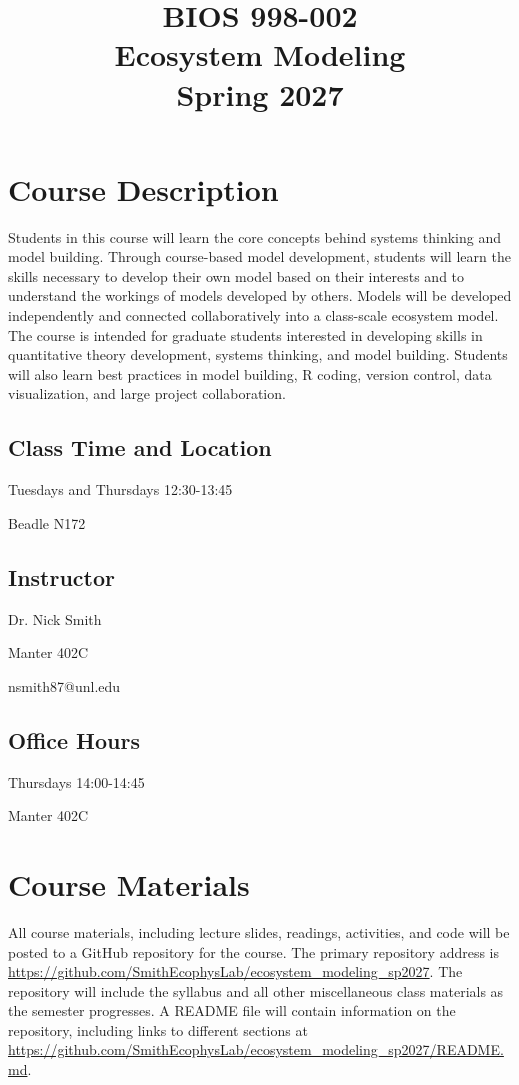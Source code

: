 \documentclass[12pt, notitlepage]{article}   	%
\title{
	\textbf{
		BIOS 998-002
	} \\
	\large Ecosystem Modeling \\
	\large Spring 2027
}
\date{\vspace{-5ex}}
\begin{document}
{\selectfont %

\maketitle

\section{Course Description}
Students in this course will learn the core concepts behind systems thinking and model building.
Through course-based model development,
students will learn the skills necessary to develop their own model based on their interests
and to understand
the workings of models developed by others. Models will be developed independently and 
connected collaboratively into a class-scale ecosystem model.
The course is intended for graduate students interested in developing skills in
quantitative theory development, systems thinking, and model building. Students will also
learn best practices in model building, R coding, version control, data visualization, 
and large project collaboration.

\subsection{Class Time and Location}
Tuesdays and Thursdays 12:30-13:45

Beadle N172

\subsection{Instructor}
Dr. Nick Smith \par
Manter 402C \par
nsmith87@unl.edu \par

\subsection{Office Hours}
Thursdays 14:00-14:45 \par
Manter 402C \par

\section{Course Materials}
All course materials, including lecture slides, readings, activities, and code 
will be posted to a GitHub repository for the course.
The primary repository address is
\url{https://github.com/SmithEcophysLab/ecosystem_modeling_sp2027}.
The repository will include the syllabus and all other miscellaneous class materials as the semester
progresses. A README file will contain information on the repository, including
links to different sections at 
\url{https://github.com/SmithEcophysLab/ecosystem_modeling_sp2027/README.md}.

}
\end{document}
